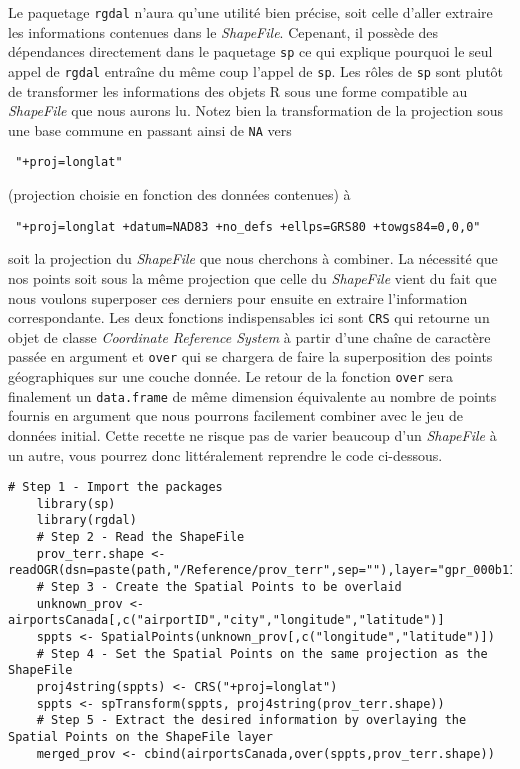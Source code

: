 Le paquetage \texttt{rgdal} n'aura qu'une utilité bien précise, soit celle d'aller extraire les informations contenues dans le \emph{ShapeFile}. Cepenant, il possède des dépendances directement dans le paquetage \texttt{sp} ce qui explique pourquoi le seul appel de \texttt{rgdal} entraîne du même coup l'appel de \texttt{sp}. Les rôles de \texttt{sp} sont plutôt de transformer les informations des objets R sous une forme compatible au \emph{ShapeFile} que nous aurons lu. Notez bien la transformation de la projection sous une base commune en passant ainsi de \texttt{NA} vers \begin{verbatim} "+proj=longlat" \end{verbatim} (projection choisie en fonction des données contenues) à \begin{verbatim} "+proj=longlat +datum=NAD83 +no_defs +ellps=GRS80 +towgs84=0,0,0" \end{verbatim} soit la projection du \emph{ShapeFile} que nous cherchons à combiner. La nécessité que nos points soit sous la même projection que celle du \emph{ShapeFile} vient du fait que nous voulons superposer ces derniers pour ensuite en extraire l'information correspondante. Les deux fonctions indispensables ici sont \texttt{CRS} qui retourne un objet de classe \emph{Coordinate Reference System} à partir d'une chaîne de caractère passée en argument et \texttt{over} qui se chargera de faire la superposition des points géographiques sur une couche donnée. Le retour de la fonction \texttt{over} sera finalement un \texttt{data.frame} de même dimension équivalente au nombre de points fournis en argument que nous pourrons facilement combiner avec le jeu de données initial. Cette recette ne risque pas de varier beaucoup d'un \emph{ShapeFile} à un autre, vous pourrez donc littéralement reprendre le code ci-dessous. \\

\begin{lstlisting}[caption = Traitement standard de données géospatiales en R,label=src:GeoDataR]
	# Step 1 - Import the packages	
	library(sp)
	library(rgdal)
	# Step 2 - Read the ShapeFile
	prov_terr.shape <- readOGR(dsn=paste(path,"/Reference/prov_terr",sep=""),layer="gpr_000b11a_e")
	# Step 3 - Create the Spatial Points to be overlaid
	unknown_prov <- airportsCanada[,c("airportID","city","longitude","latitude")]
	sppts <- SpatialPoints(unknown_prov[,c("longitude","latitude")])
	# Step 4 - Set the Spatial Points on the same projection as the ShapeFile
	proj4string(sppts) <- CRS("+proj=longlat")
	sppts <- spTransform(sppts, proj4string(prov_terr.shape))
	# Step 5 - Extract the desired information by overlaying the Spatial Points on the ShapeFile layer
	merged_prov <- cbind(airportsCanada,over(sppts,prov_terr.shape))
\end{lstlisting}

